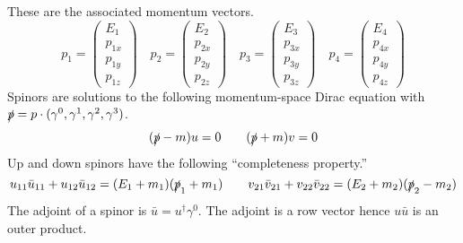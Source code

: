 \documentclass[12pt]{article}
\begin{document}
%
These are the associated momentum vectors.
$$
p_1=\begin{pmatrix}E_1\\p_{1x}\\p_{1y}\\p_{1z}\end{pmatrix}\quad
p_2=\begin{pmatrix}E_2\\p_{2x}\\p_{2y}\\p_{2z}\end{pmatrix}\quad
p_3=\begin{pmatrix}E_3\\p_{3x}\\p_{3y}\\p_{3z}\end{pmatrix}\quad
p_4=\begin{pmatrix}E_4\\p_{4x}\\p_{4y}\\p_{4z}\end{pmatrix}
$$
Spinors are solutions to the following momentum-space Dirac equation with
$\slashed{p}=p\cdot(\gamma^0,\gamma^1,\gamma^2,\gamma^3)$.
$$
(\slashed{p}-m)u=0\qquad(\slashed{p}+m)v=0
$$
Up and down spinors have the following ``completeness property.''
$$
u_{11}\bar{u}_{11}+u_{12}\bar{u}_{12}=(E_1+m_1)(\slashed{p}_1+m_1)\qquad
v_{21}\bar{v}_{21}+v_{22}\bar{v}_{22}=(E_2+m_2)(\slashed{p}_2-m_2)
$$
The adjoint of a spinor is $\bar{u}=u^\dag\gamma^0$.
The adjoint is a row vector hence $u\bar{u}$ is an outer product.
\end{document}

